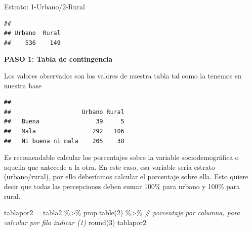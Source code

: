\documentclass[
]{article}
\newenvironment{Shaded}{\begin{snugshade}}{\end{snugshade}}
\newcommand{\AttributeTok}[1]{\textcolor[rgb]{0.77,0.63,0.00}{#1}}
\newcommand{\CommentTok}[1]{\textcolor[rgb]{0.56,0.35,0.01}{\textit{#1}}}
\newcommand{\DecValTok}[1]{\textcolor[rgb]{0.00,0.00,0.81}{#1}}
\newcommand{\FunctionTok}[1]{\textcolor[rgb]{0.00,0.00,0.00}{#1}}
\newcommand{\NormalTok}[1]{#1}
\newcommand{\OtherTok}[1]{\textcolor[rgb]{0.56,0.35,0.01}{#1}}
\newcommand{\SpecialCharTok}[1]{\textcolor[rgb]{0.00,0.00,0.00}{#1}}
\newcommand{\StringTok}[1]{\textcolor[rgb]{0.31,0.60,0.02}{#1}}
\begin{document}
Estrato: 1-Urbano/2-Rural

\begin{Shaded}
\end{Shaded}

\begin{verbatim}
## 
## Urbano  Rural 
##    536    149
\end{verbatim}

\textbf{PASO 1: Tabla de contingencia}

Los valores observados son los valores de nuestra tabla tal como la
tenemos en nuestra base

\begin{Shaded}
\end{Shaded}

\begin{verbatim}
##                   
##                    Urbano Rural
##   Buena                39     5
##   Mala                292   106
##   Ni buena ni mala    205    38
\end{verbatim}

Es recomendable calcular los porcentajes sobre la variable
sociodemográfica o aquella que antecede a la otra. En este caso, esa
variable sería estrato (urbano/rural), por ello deberíamos calcular el
porcentaje sobre ella. Esto quiere decir que todas las percepciones
deben sumar 100\% para urbano y 100\% para rural.

\begin{Shaded}
\begin{Highlighting}[]
\NormalTok{tablapor2 }\OtherTok{=}\NormalTok{ tabla2 }\SpecialCharTok{\%\textgreater{}\%}
  \FunctionTok{prop.table}\NormalTok{(}\DecValTok{2}\NormalTok{) }\SpecialCharTok{\%\textgreater{}\%}  \CommentTok{\# porcentaje por columna, para calcular por fila indicar (1)}
  \FunctionTok{round}\NormalTok{(}\DecValTok{3}\NormalTok{)}
\NormalTok{tablapor2}
\end{Highlighting}
\end{Shaded}
\end{document}
